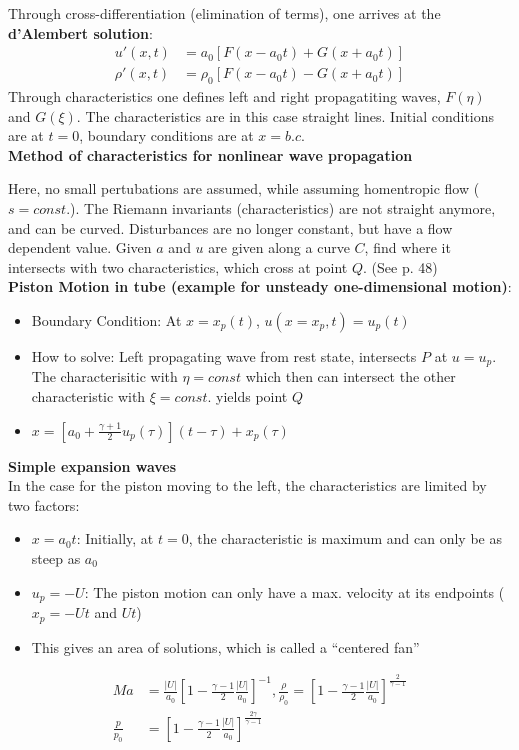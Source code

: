 \documentclass[8pt, landscape, fleqn]{scrartcl}
\begin{document}
\begin{multicols*}{3}
Through cross-differentiation (elimination of terms), one arrives at the \textbf{d'Alembert solution}:
\begin{align*}
    u'(x,t) &= a_0 [F(x-a_0t) + G(x+a_0t)] \\
    \rho'(x,t) &= \rho_0 [F(x-a_0t) - G(x+a_0t)]
\end{align*}
Through characteristics one defines left and right propagatiting waves, $F(\eta)$ and $G(\xi)$. The characteristics are in this case straight lines. Initial conditions are at $t=0$, boundary conditions are at $x=b.c.$ \\

\textbf{Method of characteristics for nonlinear wave propagation}

Here, no small pertubations are assumed, while assuming homentropic flow ($s=const.$). The Riemann invariants (characteristics) are not straight anymore, and can be curved. Disturbances are no longer constant, but have a flow dependent value. Given $a$ and $u$ are given along a curve $C$, find where it intersects with two characteristics, which cross at point $Q$. (See p. 48) \\ 

\textbf{Piston Motion in tube (example for unsteady one-dimensional motion)}:

\begin{itemize}
    \item Boundary Condition: At $x = x_p(t)$, $u(x=x_p,t) = u_p(t)$
    \item How to solve: Left propagating wave from rest state, intersects $P$ at $u=u_p$. The characterisitic with $\eta = const$ which then can intersect the other characteristic with $\xi = const. $ yields point $Q$
    \item $x = \left[ a_0 + \frac{\gamma + 1}{2} u_p(\tau)\right](t-\tau) + x_p(\tau)$
\end{itemize}

\textbf{Simple expansion waves} \\
In the case for the piston moving to the left, the characteristics are limited by two factors:

\begin{itemize}
    \item $x=a_0 t$: Initially, at $t=0$, the characteristic is maximum and can only be as steep as $a_0$
    \item $u_p=-U$: The piston motion can only have a max. velocity at its endpoints ($x_p = -Ut$ and $Ut$)
    \item This gives an area of solutions, which is called a ``centered fan''
\end{itemize}
\begin{align*}
    Ma &= \frac{|U|}{a_0} \left[ 1- \frac{\gamma -1}{2} \frac{|U|}{a_0} \right]^{-1},
    \frac{\rho}{\rho_0} = \left[ 1- \frac{\gamma-1}{2} \frac{|U|}{a_0} \right]^{\frac{2}{\gamma-1}} \\
    \frac{p}{p_0} &= \left[ 1- \frac{\gamma-1}{2} \frac{|U|}{a_0} \right]^{\frac{2 \gamma}{\gamma-1}}
\end{align*}


\end{multicols*}
\end{document}
